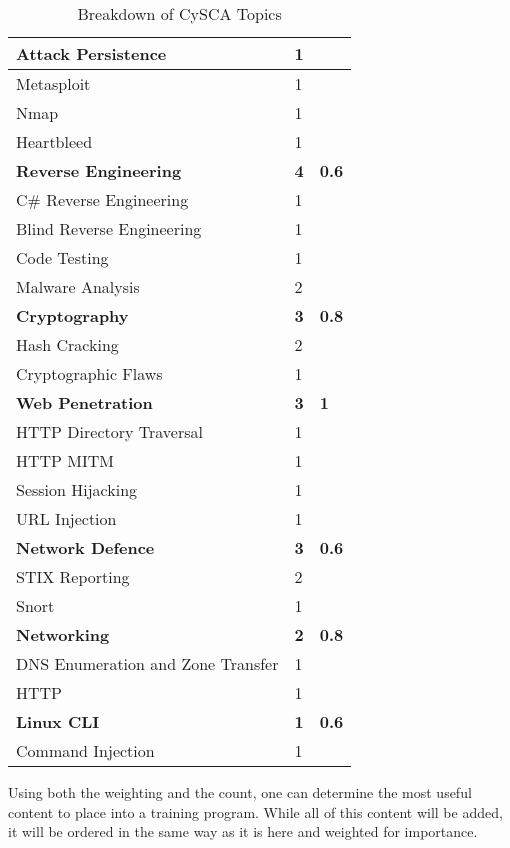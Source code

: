 \documentclass[a4paper,11pt]{report}
\begin{document}
\begin{table}[htb]
\begin{tabular}{| l | l | l |}
				\quad Attack Persistence & 1 & \\ \hline 
				\quad Metasploit & 1 & \\ \hline 
				\quad Nmap & 1 & \\ \hline 
				\quad Heartbleed & 1 & \\ \hline
				\textbf{Reverse Engineering} & \textbf{4} & \textbf{0.6}\\ \hline 
				\quad C\# Reverse Engineering & 1 & \\ \hline
				\quad Blind Reverse Engineering & 1 & \\ \hline 
				\quad Code Testing & 1 & \\ \hline 
				\quad Malware Analysis & 2 & \\ \hline
				\textbf{Cryptography} & \textbf{3} & \textbf{0.8} \\ \hline 
				\quad Hash Cracking & 2 & \\ \hline
				\quad Cryptographic Flaws & 1 & \\ \hline 
				\textbf{Web Penetration} & \textbf{3} & \textbf{1} \\ \hline
				\quad HTTP Directory Traversal & 1 & \\ \hline
				\quad HTTP MITM & 1 & \\ \hline
				\quad Session Hijacking & 1 & \\ \hline
				\quad URL Injection & 1 & \\ \hline
				\textbf{Network Defence} & \textbf{3} & \textbf{0.6} \\ \hline
				\quad STIX Reporting & 2 & \\ \hline
				\quad Snort & 1 & \\ \hline
				\textbf{Networking} & \textbf{2} & \textbf{0.8}\\ \hline
				\quad DNS Enumeration and Zone Transfer & 1 & \\ \hline 
				\quad HTTP & 1 & \\ \hline 
				\textbf{Linux CLI} & \textbf{1} &\textbf{0.6} \\ \hline
				\quad Command Injection & 1 & \\ \hline 
			\end{tabular}
			\caption{Breakdown of CySCA Topics}
			\label{tab:CySCABreakdown}
		\end{table}
		Using both the weighting and the count, one can determine the most useful content to place into a training program. 
		While all of this content will be added, it will be ordered in the same way as it is here and weighted for importance. 
\end{document}
